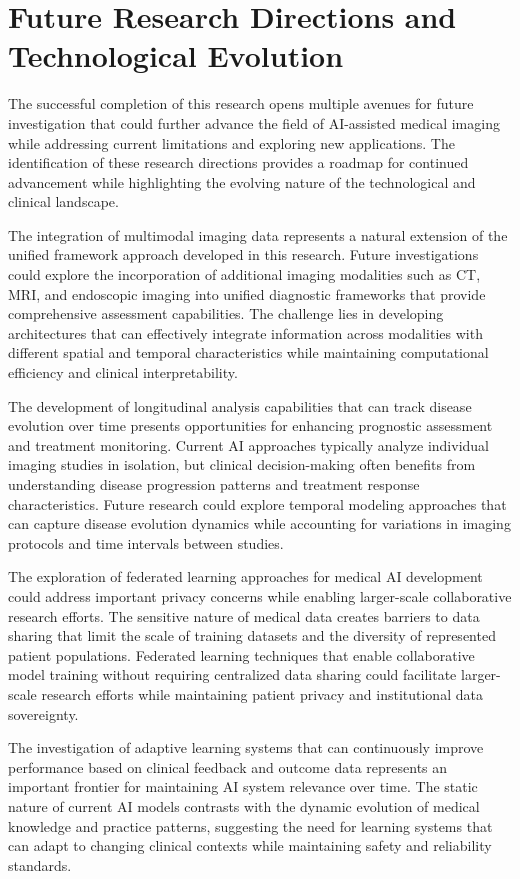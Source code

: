 \section{Future Research Directions and Technological Evolution}

The successful completion of this research opens multiple avenues for future investigation that could further advance the field of AI-assisted medical imaging while addressing current limitations and exploring new applications. The identification of these research directions provides a roadmap for continued advancement while highlighting the evolving nature of the technological and clinical landscape.

The integration of multimodal imaging data represents a natural extension of the unified framework approach developed in this research. Future investigations could explore the incorporation of additional imaging modalities such as CT, MRI, and endoscopic imaging into unified diagnostic frameworks that provide comprehensive assessment capabilities. The challenge lies in developing architectures that can effectively integrate information across modalities with different spatial and temporal characteristics while maintaining computational efficiency and clinical interpretability.

The development of longitudinal analysis capabilities that can track disease evolution over time presents opportunities for enhancing prognostic assessment and treatment monitoring. Current AI approaches typically analyze individual imaging studies in isolation, but clinical decision-making often benefits from understanding disease progression patterns and treatment response characteristics. Future research could explore temporal modeling approaches that can capture disease evolution dynamics while accounting for variations in imaging protocols and time intervals between studies.

The exploration of federated learning approaches for medical AI development could address important privacy concerns while enabling larger-scale collaborative research efforts. The sensitive nature of medical data creates barriers to data sharing that limit the scale of training datasets and the diversity of represented patient populations. Federated learning techniques that enable collaborative model training without requiring centralized data sharing could facilitate larger-scale research efforts while maintaining patient privacy and institutional data sovereignty.

The investigation of adaptive learning systems that can continuously improve performance based on clinical feedback and outcome data represents an important frontier for maintaining AI system relevance over time. The static nature of current AI models contrasts with the dynamic evolution of medical knowledge and practice patterns, suggesting the need for learning systems that can adapt to changing clinical contexts while maintaining safety and reliability standards.

